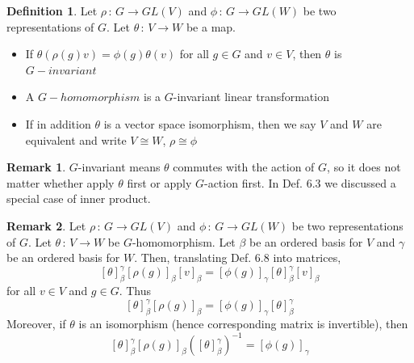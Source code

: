 \documentclass{book}
\theoremstyle{definition}
\newtheorem{definition}[lemma]{Definition}
\theoremstyle{remarkstyle}
\newtheorem*{remark}{Remark}%
\begin{document}
\begin{definition}
    Let $\rho\,:\,G \rightarrow GL(V) $ and $\phi\,:\, G\rightarrow GL(W)$ be two representations of $G$. Let $\theta\,:\,V\rightarrow W$ be a map.
    \begin{itemize}
        \item If $\theta(\rho(g)v) = \phi(g)\theta(v) $ for all $g\in G$ and $v\in V$, then $\theta$ is $G-invariant$
        \item A $G-homomorphism$ is a $G$-invariant linear transformation
        \item If in addition $\theta$ is a vector space isomorphism, then we say $V$ and $W$ are equivalent and write $V\cong W$, $\rho \cong \phi$
    \end{itemize}
\end{definition}
\begin{remark}
    $G$-invariant means $\theta$ commutes with the action of $G$, so it does not matter whether apply $\theta$ first or apply $G$-action first. In Def. 6.3 we discussed a special case of inner product. 
\end{remark}
\begin{remark}
    Let $\rho\,:\,G \rightarrow GL(V) $ and $\phi\,:\, G\rightarrow GL(W)$ be two representations of $G$. Let $\theta\,:\,V\rightarrow W$ be $G$-homomorphism. Let $\beta$ be an ordered basis for $V$ and $\gamma$ be an ordered basis for $W$. Then, translating Def. 6.8 into matrices,
    $$
    [\theta]^\gamma_\beta[\rho(g)]_\beta[v]_\beta = [\phi(g)]_\gamma[\theta]^\gamma_\beta[v]_\beta
    $$
    for all $v\in V$ and $g\in G$. Thus 
    $$
    [\theta]^\gamma_\beta[\rho(g)]_\beta = [\phi(g)]_\gamma[\theta]^\gamma_\beta
    $$
    Moreover, if $\theta$ is an isomorphism (hence corresponding matrix is invertible), then 
    $$
    [\theta]^\gamma_\beta[\rho(g)]_\beta([\theta]^\gamma_\beta)^{-1} = [\phi(g)]_\gamma
    $$
    \newline
\end{remark}
\end{document}
